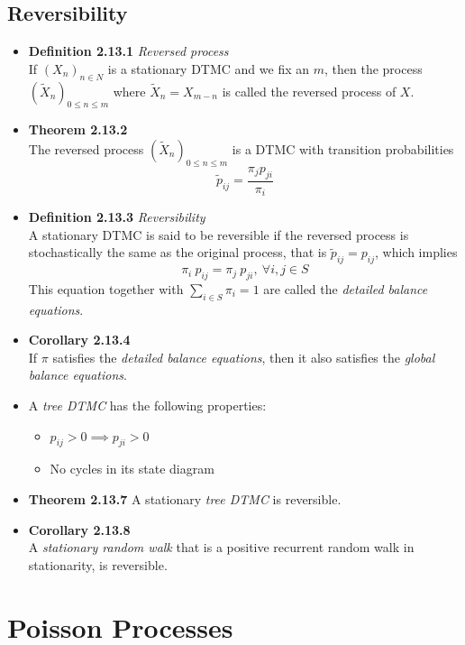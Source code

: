 \documentclass[11pt,a4paper]{article}
\begin{document}
\subsection{Reversibility}
\begin{itemize}
	\item \textbf{Definition 2.13.1} \emph{Reversed process} \\
		If $(X_n)_{n \in N}$ is a stationary DTMC and we fix an $m$, then the process $(\widetilde{X}_n)_{0 \leq n \leq m}$ where $\widetilde{X}_n = X_{m-n}$ is called the reversed process of $X$.
	\item \textbf{Theorem 2.13.2} \\
		The reversed process $(\widetilde{X}_n)_{0 \leq n \leq m}$ is a DTMC with transition probabilities
		$$\widetilde{p}_{ij} = \frac{\pi_jp_{ji}}{\pi_i}$$
	\item \textbf{Definition 2.13.3} \emph{Reversibility} \\
		A stationary DTMC is said to be reversible if the reversed process is stochastically the same as the original process,
		that is $\widetilde{p}_{ij} = p_{ij}$, which implies
		$$\pi_i \ p_{ij} = \pi_j \ p_{ji}, \ \forall i, j \in S$$
        This equation together with $\sum_{i \in S} \pi_i = 1$
        are called the \emph{detailed balance equations}.
    \item \textbf{Corollary 2.13.4} \\
		If $\pi$ satisfies the \emph{detailed balance equations}, then it also satisfies the \emph{global balance equations}.
	\item A \emph{tree DTMC} has the following properties:
		\begin{itemize}
			\item $p_{ij} > 0 \implies p_{ji} > 0$
			\item No cycles in its state diagram
		\end{itemize}
	\item \textbf{Theorem 2.13.7} A stationary \emph{tree DTMC} is reversible.
	\item \textbf{Corollary 2.13.8} \\
		A \emph{stationary random walk} that is a positive recurrent random walk in stationarity, is reversible.
\end{itemize}

\section{Poisson Processes}
\end{document}
